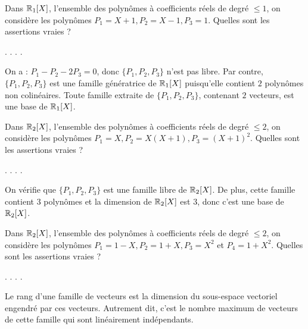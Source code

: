 \begin{question}
Dans $\mathbb{R}_1[X]$, l'ensemble des polynômes à coefficients réels de degré $\le 1$, on considère les polynômes $P_1= X+1, P_2= X-1, P_3 = 1$. Quelles sont les assertions vraies ?
\begin{answers}  
.
.
.
.
\end{answers}
\begin{explanations} On a : $P_1-P_2-2P_3=0$, donc $\{P_1,P_2,P_3 \}$ n'est pas libre. Par contre, $\{P_1,P_2,P_3 \}$ est une famille génératrice de $\mathbb{R}_1[X]$ puisqu'elle contient $2$ polynômes non colinéaires. Toute famille extraite de $\{P_1,P_2,P_3 \}$, contenant $2$ vecteurs, est une base de $\mathbb{R}_1[X]$.
\end{explanations}
\end{question}

\begin{question}
Dans $\mathbb{R}_2[X]$, l'ensemble des polynômes à coefficients réels de degré $\le 2$, on considère les polynômes $P_1= X, P_2= X(X+1), P_3 = (X+1)^2$. Quelles sont les assertions vraies ?
\begin{answers}  
.
.
.
.
\end{answers}
\begin{explanations} On vérifie que $\{P_1,P_2,P_3 \}$ est une famille libre de $\mathbb{R}_2[X]$. De plus, cette famille contient 
$3$ polynômes  et la dimension de $\mathbb{R}_2[X]$ est $3$, donc c'est une base de $\mathbb{R}_2[X]$.
\end{explanations}
\end{question}


\begin{question}
Dans  $\mathbb{R}_2[X]$, l'ensemble des polynômes à coefficients réels de degré $\le 2$, on considère les polynômes $P_1= 1-X, P_2= 1+X, P_3 = X^2$ et $P_4=1+X^2$. Quelles sont les assertions vraies ?
\begin{answers}  
.
.
.
.
\end{answers}
\begin{explanations} Le rang d'une famille de vecteurs est la dimension du sous-espace vectoriel
engendré par ces vecteurs. Autrement dit, c'est le nombre maximum de vecteurs de cette famille qui sont linéairement indépendants.
\end{explanations}
\end{question}


